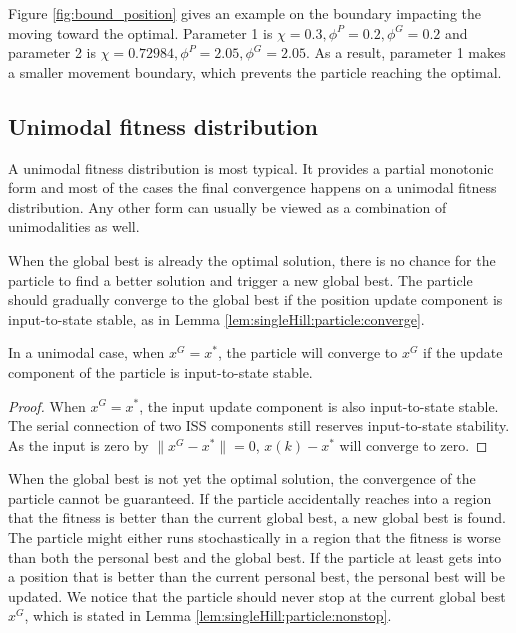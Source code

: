 Figure \ref{fig:bound_position} gives an example on the boundary impacting the moving toward the optimal.
Parameter 1 is $ \chi = 0.3, \phi^{P} = 0.2, \phi^{G} = 0.2 $ and parameter 2 is $ \chi = 0.72984, \phi^{P} = 2.05, \phi^{G} = 2.05 $.
As a result, parameter 1 makes a smaller movement boundary, which prevents the particle reaching the optimal.

\subsection{Unimodal fitness distribution}

A unimodal fitness distribution is most typical.
It provides a partial monotonic form and most of the cases the final convergence happens on a unimodal fitness distribution.
Any other form can usually be viewed as a combination of unimodalities as well.

When the global best is already the optimal solution, there is no chance for the particle to find a better solution and trigger a new global best.
The particle should gradually converge to the global best if the position update component is input-to-state stable, as in Lemma \ref{lem:singleHill:particle:converge}.

\begin{mylem}
\label{lem:singleHill:particle:converge}
In a unimodal case, when $ x^{G} = x^{*} $, the particle will converge to $ x^{G} $ if the update component of the particle is input-to-state stable.
\begin{proof}
When $ x^{G} = x^{*} $, the input update component is also input-to-state stable.
The serial connection of two ISS components still reserves input-to-state stability.
As the input is zero by $ \lVert x^{G} - x^{*} \rVert = 0 $, $ x(k) - x^{*} $ will converge to zero.
\end{proof}
\end{mylem}

When the global best is not yet the optimal solution, the convergence of the particle cannot be guaranteed.
If the particle accidentally reaches into a region that the fitness is better than the current global best, a new global best is found.
The particle might either runs stochastically in a region that the fitness is worse than both the personal best and the global best.
If the particle at least gets into a position that is better than the current personal best, the personal best will be updated. 
We notice that the particle should never stop at the current global best $ x^{G} $, which is stated in Lemma \ref{lem:singleHill:particle:nonstop}.

